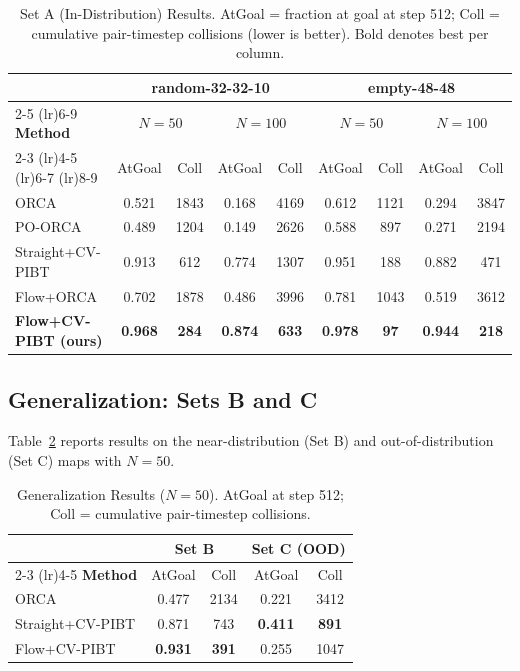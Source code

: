 \begin{table}[t]
\centering
\caption{Set A (In-Distribution) Results. AtGoal = fraction at goal at step 512; Coll = cumulative pair-timestep collisions (lower is better). Bold denotes best per column.}
\label{tab:set_a}
\renewcommand{\arraystretch}{1.15}
\begin{tabular}{lcccccccc}
\toprule
& \multicolumn{4}{c}{\textbf{random-32-32-10}} & \multicolumn{4}{c}{\textbf{empty-48-48}} \\
\cmidrule(lr){2-5} \cmidrule(lr){6-9}
\textbf{Method} & \multicolumn{2}{c}{$N=50$} & \multicolumn{2}{c}{$N=100$} & \multicolumn{2}{c}{$N=50$} & \multicolumn{2}{c}{$N=100$} \\
\cmidrule(lr){2-3} \cmidrule(lr){4-5} \cmidrule(lr){6-7} \cmidrule(lr){8-9}
& AtGoal & Coll & AtGoal & Coll & AtGoal & Coll & AtGoal & Coll \\
\midrule
ORCA~\cite{vandenberg2011orca} & 0.521 & 1843 & 0.168 & 4169 & 0.612 & 1121 & 0.294 & 3847 \\
PO-ORCA & 0.489 & 1204 & 0.149 & 2626 & 0.588 & 897 & 0.271 & 2194 \\
Straight+CV-PIBT & 0.913 & 612 & 0.774 & 1307 & 0.951 & 188 & 0.882 & 471 \\
Flow+ORCA & 0.702 & 1878 & 0.486 & 3996 & 0.781 & 1043 & 0.519 & 3612 \\
\midrule
\textbf{Flow+CV-PIBT (ours)} & \textbf{0.968} & \textbf{284} & \textbf{0.874} & \textbf{633} & \textbf{0.978} & \textbf{97} & \textbf{0.944} & \textbf{218} \\
\bottomrule
\end{tabular}
\end{table}

\subsection{Generalization: Sets B and C}
\label{sec:experiments:generalization}

Table~\ref{tab:generalization} reports results on the near-distribution (Set B) and out-of-distribution (Set C) maps with $N{=}50$.

\begin{table}[t]
\centering
\caption{Generalization Results ($N=50$). AtGoal at step 512; Coll = cumulative pair-timestep collisions.}
\label{tab:generalization}
\renewcommand{\arraystretch}{1.15}
\begin{tabular}{lcccc}
\toprule
& \multicolumn{2}{c}{\textbf{Set B}} & \multicolumn{2}{c}{\textbf{Set C (OOD)}} \\
\cmidrule(lr){2-3} \cmidrule(lr){4-5}
\textbf{Method} & AtGoal & Coll & AtGoal & Coll \\
\midrule
ORCA & 0.477 & 2134 & 0.221 & 3412 \\
Straight+CV-PIBT & 0.871 & 743 & \textbf{0.411} & \textbf{891} \\
Flow+CV-PIBT & \textbf{0.931} & \textbf{391} & 0.255 & 1047 \\
\bottomrule
\end{tabular}
\end{table}

